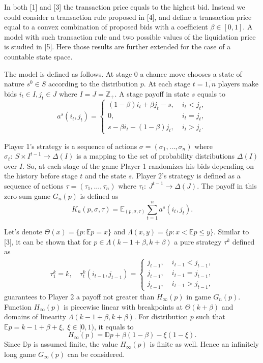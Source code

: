 In both [1] and [3] the transaction price equals to the highest bid. Instead we
could consider a transaction rule proposed in [4], and define a transaction
price equal to a convex combination of proposed bids with a coefficient $\beta
\in [0, 1]$. A model with such transaction rule and two possible values of the
liquidation price is studied in [5]. Here those results are further extended for
the case of a countable state space.

The model is defined as follows. At stage 0 a chance move chooses a state of
nature $s^0 \in S$ according to the distribution $p$. At each stage $t =
\overline{1,n}$ players make bids $i_t \in I, j_t \in J$ where $I = J =
\mathbb{Z}_+$. A stage payoff in state $s$ equals to
\begin{equation*}
  a^s(i_t, j_t) =
  \begin{cases}
    (1-\beta) i_t + \beta j_t - s, &\; i_t < j_t,\\
    0, &\; i_t = j_t,\\
    s - \beta i_t - (1-\beta) j_t, &\; i_t > j_t.
  \end{cases}
\end{equation*}

Player 1's strategy is a sequence of actions $\sigma = (\sigma_1, \ldots,
\sigma_n)$ where $\sigma_t:~S \times I^{t-1} \rightarrow \Delta(I)$ is a mapping
to the set of probability distributions $\Delta(I)$ over $I$. So, at each stage
of the game Player 1 randomizes his bids depending on the history before stage
$t$ and the state $s$. Player 2's strategy is defined as a sequence of actions
$\tau = (\tau_1, \ldots, \tau_n)$ where $\tau_t:~J^{t-1} \rightarrow \Delta(J)$.
The payoff in this zero-sum game $G_n(p)$ is defined as
\begin{equation*}
  K_n(p, \sigma, \tau) = \mathbb{E}_{(p, \sigma, \tau)} \sum_{t=1}^n a^s(i_t,j_t).
\end{equation*}

Let's denote $\Theta(x) = \{p: \mathbb{E} p = x\}$ and $\Lambda(x, y) = \{p: x <
\mathbb{E}p \leq y \}$. Similar to [3], it can be shown that for $p \in
\Lambda(k-1+\beta, k+\beta)$ a pure strategy $\tau^k$ defined as
\begin{gather}
  \tau_1^k = k, \quad \tau_t^k(i_{t-1}, j_{t-1}) =
  \begin{cases}
    j_{t-1}, &\; i_{t-1} < j_{t-1},\\
    j_{t-1}, &\; i_{t-1} = j_{t-1},\\
    j_{t-1}, &\; i_{t-1} > j_{t-1},
  \end{cases}
\end{gather}
guarantees to Player 2 a payoff not greater than $H_\infty(p)$ in game $G_n(p)$.
Function $H_\infty(p)$ is piecewise linear with breakpoints at $\Theta(k+\beta)$
and domains of linearity $\Lambda(k-1+\beta, k+\beta)$. For distribution $p$
such that $\mathbb{E} p = k - 1 + \beta + \xi, \; \xi \in [0, 1)$, it equals to
\begin{equation}
  H_\infty(p) = \mathbb{D} p + \beta(1-\beta) -\xi(1-\xi).
\end{equation}
Since $\mathbb{D}p$ is assumed finite, the value $H_\infty(p)$ is finite as
well. Hence an infinitely long game $G_\infty(p)$ can be considered.

